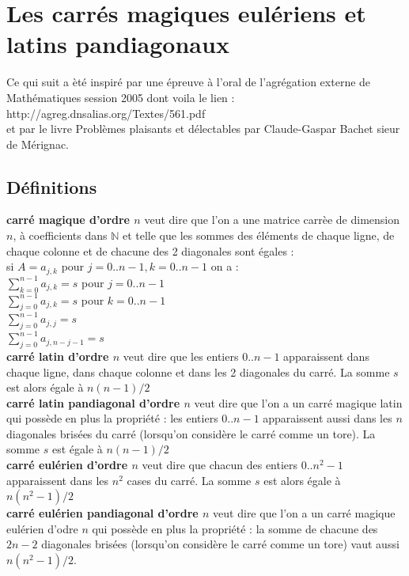 \documentclass[a4paper,11pt]{book}
\newcommand{\N}{{\mathbb{N}}}
\begin{document}
\section{Les carr\'es magiques eul\'eriens et latins pandiagonaux}
Ce qui suit a \`et\'e inspir\'e par  une \'epreuve \`a l'oral de l'agr\'egation
externe de Math\'ematiques session 2005 dont voila le lien :\\
http://agreg.dnsalias.org/Textes/561.pdf\\
et par le livre Probl\`emes plaisants et d\'electables par Claude-Gaspar Bachet
sieur de M\'erignac.
\subsection{D\'efinitions}
{\bf carr\'e magique d'ordre $n$} veut dire que l'on a une matrice carr\`ee de 
dimension $n$, \`a coefficients dans $\N$ et telle que les  sommes des 
\'el\'ements de chaque ligne, de chaque colonne et de chacune des 2 diagonales 
sont \'egales :\\
si $A=a_{j,k}$ pour $j=0..n-1,k=0..n-1$ on a :\\
$\sum_{k=0}^{n-1}a_{j,k}=s$ pour $j=0..n-1$\\
$\sum_{j=0}^{n-1}a_{j,k}=s$ pour $k=0..n-1$\\
$\sum_{j=0}^{n-1}a_{j,j}=s$\\ 
$\sum_{j=0}^{n-1}a_{j,n-j-1}=s$\\
{\bf carr\'e latin d'ordre $n$} veut dire que les entiers 0..$n-1$ apparaissent
dans chaque ligne, dans chaque colonne  et dans les 2 diagonales du carr\'e. La 
somme $s$ est alors \'egale \`a $n(n-1)/2$\\
{\bf carr\'e latin pandiagonal d'ordre $n$} veut dire que l'on a un carr\'e 
magique latin qui poss\`ede en plus la propri\'et\'e : les entiers 0..$n-1$ 
apparaissent  aussi dans les $n$ diagonales bris\'ees du carr\'e (lorsqu'on 
consid\`ere le carr\'e comme un tore). La somme $s$ est \'egale \`a $n(n-1)/2$\\
{\bf carr\'e eul\'erien d'ordre $n$} veut dire que chacun 
des entiers 0..$n^2-1$ apparaissent dans les $n^2$ cases du carr\'e. La somme 
$s$ est alors \'egale \`a $n(n^2-1)/2$\\
{\bf carr\'e eul\'erien pandiagonal d'ordre $n$} veut dire que l'on a un carr\'e
magique eul\'erien d'odre $n$ qui poss\`ede en plus la propri\'et\'e : la somme
de chacune des $2n-2$ diagonales bris\'ees (lorsqu'on consid\`ere le carr\'e 
comme un tore) vaut aussi $n(n^2-1)/2$.
\end{document}
